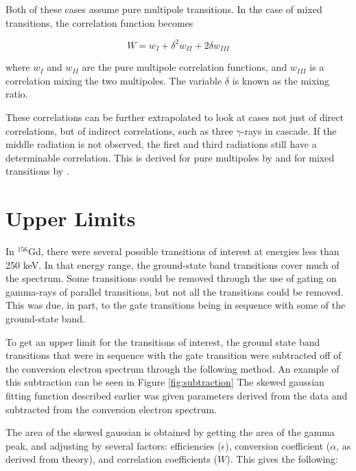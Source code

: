Both of these cases assume pure multipole transitions. In the case of mixed transitions, the correlation function becomes

\begin{equation}
    W = w_I + \delta^2 w_{II} + 2\delta w_{III}
    \label{eq:mixed_corr}
\end{equation}

where $w_I$ and $w_{II}$ are the pure multipole correlation functions, and $w_{III}$ is a correlation mixing the two multipoles. The variable $\delta$ is known as the mixing ratio. 

These correlations can be further extrapolated to look at cases not just of direct correlations, but of indirect correlations, such as three $\gamma$-rays in cascade. If the middle radiation is not observed, the first and third radiations still have a determinable correlation. This is derived for pure multipoles by \citep{biedenharn53:_theory_angular_corr} and for mixed transitions by \citep{rose53:_angular_corr_supp,osborn53:_angular_corr_3}.

\section{Upper Limits}
\label{sec:upper_limit}

In $^{156}$Gd, there were several possible transitions of interest at energies less than 250 keV. In that energy range, the ground-state band transitions cover much of the spectrum. Some transitions could be removed through the use of gating on gamma-rays of parallel transitions, but not all the transitions could be removed. This was due, in part, to the gate transitions being in sequence with some of the ground-state band. 

To get an upper limit for the transitions of interest, the ground state band transitions that were in sequence with the gate transition were subtracted off of the conversion electron spectrum through the following method. An example of this subtraction can be seen in Figure \ref{fig:subtraction} The skewed gaussian fitting function described earlier was given parameters derived from the data and subtracted from the conversion electron spectrum.



The area of the skewed gaussian is obtained by getting the area of the gamma peak, and adjusting by several factors: efficiencies ($\epsilon$), conversion coefficient ($\alpha$, as derived from theory), and correlation coefficients ($W$). This gives the following:


